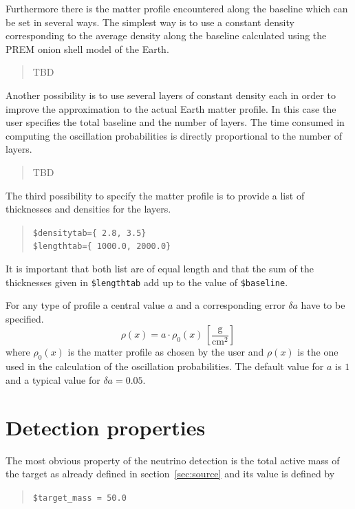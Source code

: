 Furthermore there is
the matter profile encountered along the baseline which can be set in
several ways. The simplest way is to use a constant density corresponding
to the average density along the baseline calculated using the 
PREM\cite{Stacey} onion shell model of the 
Earth.
\begin{quote}
TBD
\end{quote}


Another possibility is to use several layers of constant density each in 
order to improve the approximation to the actual Earth matter profile. In this
case the user specifies the total baseline and the number of layers. The
time consumed in computing the oscillation probabilities is directly 
proportional to the number of layers.
\begin{quote}
TBD
\end{quote}


The third possibility to specify the matter profile is to provide a list
of thicknesses and densities for the layers. 
\begin{quote}
{\tt \$densitytab=\{ 2.8, 3.5\}}\\
{\tt \$lengthtab=\{ 1000.0, 2000.0\}}\\
\end{quote}
It is important that both list are of equal length and that the sum
of the thicknesses given in  {\tt \$lengthtab} add up to the value of
{\tt \$baseline}.

For any type of profile a central value $a$ and a corresponding error 
$\delta a$ have to be specified.
\begin{equation}
\label{eq:density_error}
\rho(x)=a\cdot\rho_0(x)\,\left[\frac{\mathrm{g}}{\mathrm{cm}^2}\right]\,
\end{equation}
where $\rho_0(x)$ is the matter profile as chosen by the user and $\rho(x)$ is
the one used in the calculation of the oscillation probabilities. The default
value for $a$ is $1$ and a typical value for $\delta a = 0.05$. 


\section{Detection properties}

The most obvious property of the neutrino detection is the total
active mass of the target as already defined in section~\ref{sec:source} and
its value is defined by 
\begin{quote}
{\tt \$target\_mass = 50.0 }
\end{quote}

